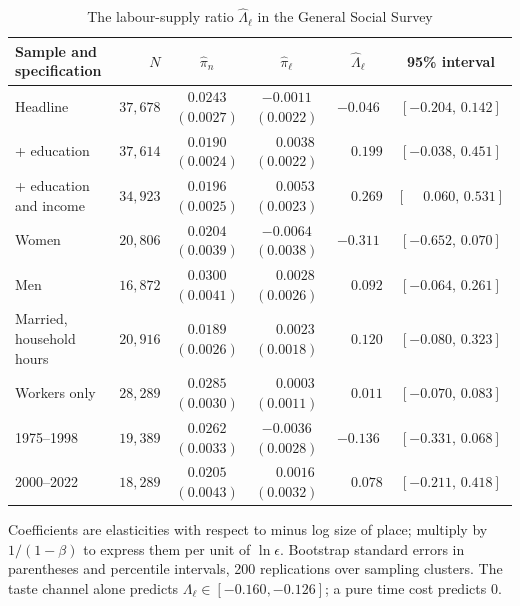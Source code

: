 \documentclass[11pt]{article}
\begin{document}
\begin{table}[h!]\centering
\begin{threeparttable}
\caption{The labour-supply ratio $\widehat\Lambda_\ell$ in the General Social Survey}
\label{tab:gss}
\footnotesize\setlength{\tabcolsep}{3.5pt}
\begin{tabular}{lrcccc}
\toprule
Sample and specification & $N$ & $\hat\pi_n$ & $\hat\pi_\ell$ & $\widehat\Lambda_\ell$ & 95\% interval\\
\midrule
Headline                              & $37{,}678$ & $0.0243$ $(0.0027)$ & $-0.0011$ $(0.0022)$ & $-0.046$ & $[-0.204,\,0.142]$\\
\quad + education                     & $37{,}614$ & $0.0190$ $(0.0024)$ & $\phantom{-}0.0038$ $(0.0022)$ & $\phantom{-}0.199$ & $[-0.038,\,0.451]$\\
\quad + education and income          & $34{,}923$ & $0.0196$ $(0.0025)$ & $\phantom{-}0.0053$ $(0.0023)$ & $\phantom{-}0.269$ & $[\phantom{-}0.060,\,0.531]$\\
Women                                 & $20{,}806$ & $0.0204$ $(0.0039)$ & $-0.0064$ $(0.0038)$ & $-0.311$ & $[-0.652,\,0.070]$\\
Men                                   & $16{,}872$ & $0.0300$ $(0.0041)$ & $\phantom{-}0.0028$ $(0.0026)$ & $\phantom{-}0.092$ & $[-0.064,\,0.261]$\\
Married, household hours              & $20{,}916$ & $0.0189$ $(0.0026)$ & $\phantom{-}0.0023$ $(0.0018)$ & $\phantom{-}0.120$ & $[-0.080,\,0.323]$\\
Workers only                          & $28{,}289$ & $0.0285$ $(0.0030)$ & $\phantom{-}0.0003$ $(0.0011)$ & $\phantom{-}0.011$ & $[-0.070,\,0.083]$\\
1975--1998                            & $19{,}389$ & $0.0262$ $(0.0033)$ & $-0.0036$ $(0.0028)$ & $-0.136$ & $[-0.331,\,0.068]$\\
2000--2022                            & $18{,}289$ & $0.0205$ $(0.0043)$ & $\phantom{-}0.0016$ $(0.0032)$ & $\phantom{-}0.078$ & $[-0.211,\,0.418]$\\
\bottomrule
\end{tabular}
\begin{tablenotes}\footnotesize
\item Coefficients are elasticities with respect to minus log size of place; multiply by
$1/(1-\beta)$ to express them per unit of $\ln\epsilon$. Bootstrap standard errors in parentheses
and percentile intervals, 200 replications over sampling clusters. The taste channel alone predicts
$\Lambda_\ell\in[-0.160,-0.126]$; a pure time cost predicts $0$.
\end{tablenotes}
\end{threeparttable}
\end{table}
\end{document}
